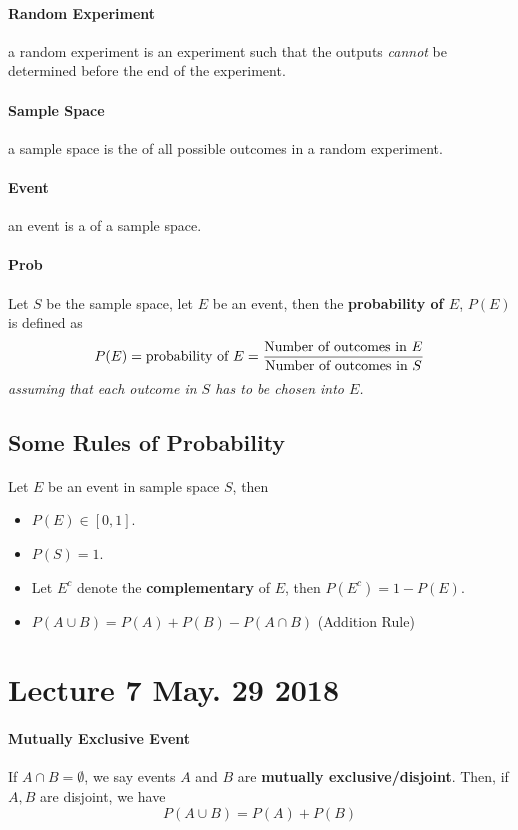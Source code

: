 \documentclass{article}
\begin{document}
		\paragraph{Random Experiment} a random experiment is an experiment such that the outputs \emph{cannot} be determined  before the end of the experiment.
		\paragraph{Sample Space} a sample space is the  of all possible outcomes in a random experiment.
		\paragraph{Event} an event is a  of a sample space.
		\paragraph{Prob} Let $S$ be the sample space, let $E$ be an event, then the \textbf{probability of $E$}, $P(E)$ is defined as
			\[
				P(E) = \text{{probability of $E$}} = \frac{\text{{Number of outcomes in $E$}}}{\text{{Number of outcomes in $S$}}}
			\]
			\emph{assuming that each outcome in $S$ has  to be chosen into $E$.}
			
		\subsection{Some Rules of Probability}
		\paragraph{} Let $E$ be an event in sample space $S$, then
		\begin{itemize}
			\item $P(E) \in [0, 1]$.
			\item $P(S) = 1$.
			\item Let $E^c$ denote the \textbf{complementary} of $E$, then $P(E^c) = 1 - P(E)$.
			\item $P(A \cup B) = P(A) + P(B) - P(A \cap B)$ (Addition Rule)
		\end{itemize}
		
	\section{Lecture 7 May. 29 2018}
		\paragraph{Mutually Exclusive Event} If $A\cap B = \emptyset$, we say events $A$ and $B$ are \textbf{mutually exclusive/disjoint}. Then, if $A,B$ are disjoint, we have 
			\[
				P(A\cup B) = P(A) + P(B)
			\]
			
\end{document}
